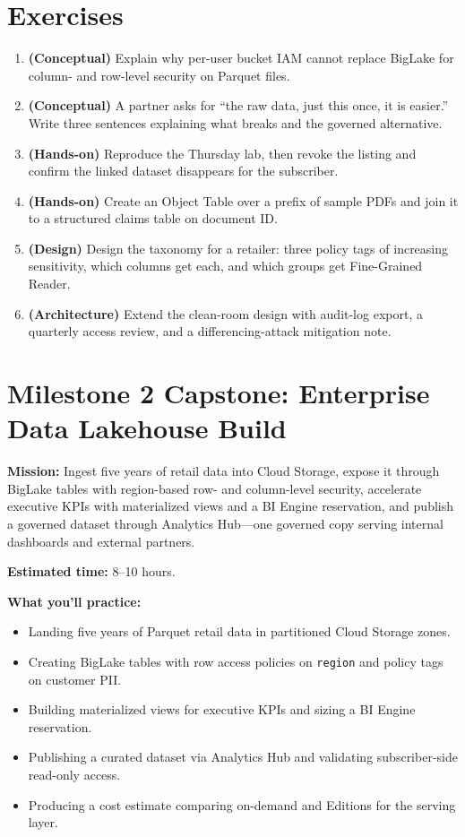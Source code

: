 \section{Exercises}
\begin{enumerate}
    \item \textbf{(Conceptual)} Explain why per-user bucket IAM cannot replace BigLake for column- and row-level security on Parquet files.
    \item \textbf{(Conceptual)} A partner asks for ``the raw data, just this once, it is easier.'' Write three sentences explaining what breaks and the governed alternative.
    \item \textbf{(Hands-on)} Reproduce the Thursday lab, then revoke the listing and confirm the linked dataset disappears for the subscriber.
    \item \textbf{(Hands-on)} Create an Object Table over a prefix of sample PDFs and join it to a structured claims table on document ID.
    \item \textbf{(Design)} Design the taxonomy for a retailer: three policy tags of increasing sensitivity, which columns get each, and which groups get Fine-Grained Reader.
    \item \textbf{(Architecture)} Extend the clean-room design with audit-log export, a quarterly access review, and a differencing-attack mitigation note.
\end{enumerate}

\section{Milestone 2 Capstone: Enterprise Data Lakehouse Build}\label{sec:ch8-capstone}

\begin{capstonebox}
\textbf{Mission:} Ingest five years of retail data into Cloud Storage, expose it through BigLake tables with region-based row- and column-level security, accelerate executive KPIs with materialized views and a BI Engine reservation, and publish a governed dataset through Analytics Hub---one governed copy serving internal dashboards and external partners.

\textbf{Estimated time:} 8--10 hours.

\textbf{What you'll practice:}
\begin{itemize}
    \item Landing five years of Parquet retail data in partitioned Cloud Storage zones.
    \item Creating BigLake tables with row access policies on \texttt{region} and policy tags on customer PII.
    \item Building materialized views for executive KPIs and sizing a BI Engine reservation.
    \item Publishing a curated dataset via Analytics Hub and validating subscriber-side read-only access.
    \item Producing a cost estimate comparing on-demand and Editions for the serving layer.
\end{itemize}
\end{capstonebox}

